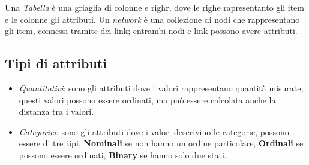 Una \textit{Tabella} è una griaglia di colonne e righr, dove le righe  rapresentanto gli item e le colonne gli attributi.
Un \textit{network} è una collezione di nodi che rappresentano gli item, connessi tramite dei link; entrambi nodi e link possono avere attributi.

\subsection{Tipi di attributi}
\begin{itemize}
    \item \textit{Quantitativi}: sono gli attributi dove i valori rappresentano quantità misurate, 
        questi valori possono essere ordinati, ma può essere calcolata anche la distanza tra i valori.
    \item  \textit{Categorici}: sono gli attributi dove i valori descrivino le categorie,
        possono essere di tre tipi, \textbf{Nominali} se non hanno un ordine particolare, \textbf{Ordinali} se possono essere ordinati,
        \textbf{Binary} se hanno solo due stati.
\end{itemize}
